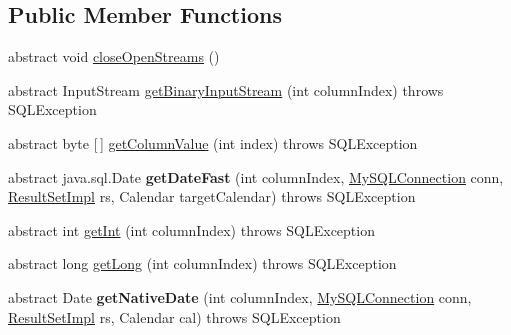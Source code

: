\subsection*{Public Member Functions}
\begin{DoxyCompactItemize}
\item 
abstract void \mbox{\hyperlink{classcom_1_1mysql_1_1jdbc_1_1_result_set_row_a54a6cea0cae63390d866d6ba7577912c}{close\+Open\+Streams}} ()
\item 
abstract Input\+Stream \mbox{\hyperlink{classcom_1_1mysql_1_1jdbc_1_1_result_set_row_a48ff052b76ef93e6dbd945e75639e995}{get\+Binary\+Input\+Stream}} (int column\+Index)  throws S\+Q\+L\+Exception
\item 
abstract byte \mbox{[}$\,$\mbox{]} \mbox{\hyperlink{classcom_1_1mysql_1_1jdbc_1_1_result_set_row_a5213f1db94bbf4bbd98c5141aff51fb8}{get\+Column\+Value}} (int index)  throws S\+Q\+L\+Exception
\item 
\mbox{\label{classcom_1_1mysql_1_1jdbc_1_1_result_set_row_a6d97394d50b7fb2a331a1ef6228a388b}} 
abstract java.\+sql.\+Date {\bfseries get\+Date\+Fast} (int column\+Index, \mbox{\hyperlink{interfacecom_1_1mysql_1_1jdbc_1_1_my_s_q_l_connection}{My\+S\+Q\+L\+Connection}} conn, \mbox{\hyperlink{classcom_1_1mysql_1_1jdbc_1_1_result_set_impl}{Result\+Set\+Impl}} rs, Calendar target\+Calendar)  throws S\+Q\+L\+Exception
\item 
abstract int \mbox{\hyperlink{classcom_1_1mysql_1_1jdbc_1_1_result_set_row_a293e31748cc32630b98c119b1a87c9ee}{get\+Int}} (int column\+Index)  throws S\+Q\+L\+Exception
\item 
abstract long \mbox{\hyperlink{classcom_1_1mysql_1_1jdbc_1_1_result_set_row_abe8370eba2fb621aa7523763fc8ef3c6}{get\+Long}} (int column\+Index)  throws S\+Q\+L\+Exception
\item 
\mbox{\label{classcom_1_1mysql_1_1jdbc_1_1_result_set_row_a1cde6961b5ccbfcc628c9c7fe76cae14}} 
abstract Date {\bfseries get\+Native\+Date} (int column\+Index, \mbox{\hyperlink{interfacecom_1_1mysql_1_1jdbc_1_1_my_s_q_l_connection}{My\+S\+Q\+L\+Connection}} conn, \mbox{\hyperlink{classcom_1_1mysql_1_1jdbc_1_1_result_set_impl}{Result\+Set\+Impl}} rs, Calendar cal)  throws S\+Q\+L\+Exception
\item 
\mbox{\label{classcom_1_1mysql_1_1jdbc_1_1_result_set_row_afdd28e52810c8279cb1f32ca96de9327}} 

\end{DoxyCompactItemize}
